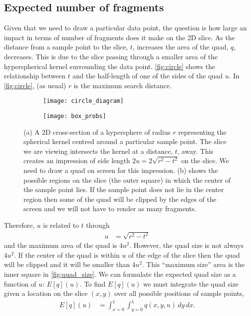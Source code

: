 \subsection{Expected number of fragments}

Given that we need to draw a particular data point, the question is how large
an impact in terms of number of fragments does it make on the 2D slice. As the
distance from a sample point to the slice, $t$, increases the area of the 
quad, $q$, decreases. This is due to the slice passing through a smaller area 
of the
hyperspherical kernel surrounding the data point. \autoref{fig:circle} shows the
relationship between $t$ and the half-length of one of the sides of the 
quad $u$.  In \autoref{fig:circle}, (as usual) $r$ is the maximum search distance.

\begin{figure}[htb]
\centering
\begin{subfigure}{0.4\textwidth}
  \texttt{[image: circle\_diagram]}
  \caption{
  }
  \label{fig:circle}
\end{subfigure}%
\begin{subfigure}{0.4\textwidth}
  \texttt{[image: box\_probs]}
  \caption{
  }
  \label{fig:quad_size}
\end{subfigure}
\caption[Kernel/slice interaction]{
  (a) A 2D cross-section of a hypersphere of radius $r$ representing 
  the spherical kernel 
  centred around a particular sample point.  The slice we are
  viewing intersects the kernel at a distance, $t$, away.  This 
  creates an impression of side length $2u = 2\sqrt{r^2-t^2}$ on the 
  slice.  We need to draw a quad on screen for this impression.
  (b) shows the possible regions on the slice (the outer square)
  in which the center of the sample point lies.  If the sample point
  does not lie in the center region then some of the quad will be clipped
  by the edges of the screen and we will not have to render as many 
  fragments.
}
\label{fig:appendix_geom}
\end{figure}

Therefore, $u$ is related to $t$ through
\begin{align}
  u &= \sqrt{r^2-t^2} \label{eq:u_to_t}
\end{align}
and the
maximum area of the quad is $4u^2$.  However, the quad size is not always
$4u^2$.   If the center of the quad is within $u$ of the edge of the slice
then the quad will be clipped and it will be smaller than $4u^2$.
This ``maximum size'' area is the inner square in \autoref{fig:quad_size}.
We can formulate the expected quad size as a function of $u$: $E[q](u)$.
To find $E[q](u)$ we must integrate the quad size given a location on 
the slice $(x,y)$ over all possible positions of sample points,
\begin{align*}
  E[q](u) &= \int_{x=0}^1 \int_{y=0}^1 q(x, y, u) \, dy \, dx
  \text{.}
\end{align*}

